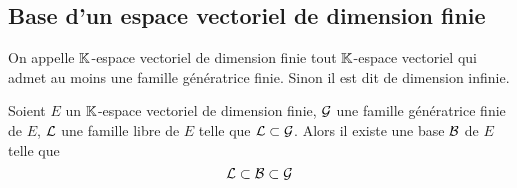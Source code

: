 \subsection{Base d'un espace vectoriel de dimension finie}

\begin{defdef}
  On appelle \(\mathbb{K}\)-espace vectoriel de dimension finie tout \(\mathbb{K}\)-espace
  vectoriel qui admet au moins une famille génératrice finie. Sinon il est dit
  de dimension infinie.
\end{defdef}

\begin{theo}
  Soient \(E\) un \(\mathbb{K}\)-espace vectoriel de dimension finie, \(\mathcal{G}\) une famille
  génératrice finie de \(E\), \(\mathcal{L}\) une famille libre de \(E\) telle que \(\mathcal{L}
  \subset \mathcal{G}\). Alors il existe une base \(\mathcal{B}\) de \(E\) telle que
  \begin{equation}
    \mathcal{L} \subset \mathcal{B} \subset \mathcal{G}
  \end{equation}
\end{theo}

